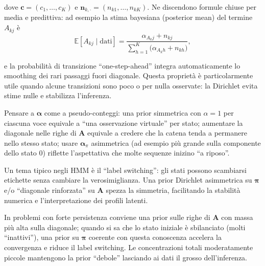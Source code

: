 \documentclass[
  italian,
  a4paper,
  a4paper,
  twoside,
  open=right,
  12pt]{scrbook}
\theoremstyle{definition}
\theoremstyle{remark}
\begin{document}
dove \(\mathbf{c}=(c_1,\dots,c_K)\) e
\(\mathbf{n}_{k,\cdot}=(n_{k1},\dots,n_{kK})\). Ne discendono formule
chiuse per media e predittiva: ad esempio la stima bayesiana (posterior
mean) del termine \(A_{k j}\) è \[
\mathbb{E}\!\left[A_{k j}\mid \text{dati}\right]
= \frac{\alpha_{A_k j} + n_{k j}}{\sum_{h=1}^K \big(\alpha_{A_k h} + n_{k h}\big)},
\]

e la probabilità di transizione ``one-step-ahead'' integra
automaticamente lo smoothing dei rari passaggi fuori diagonale. Questa
proprietà è particolarmente utile quando alcune transizioni sono poco o
per nulla osservate: la Dirichlet evita stime nulle e stabilizza
l'inferenza.

\begin{tcolorbox}[enhanced jigsaw, breakable, colframe=quarto-callout-note-color-frame, toprule=.15mm, title=\textcolor{quarto-callout-note-color}{\faInfo}\hspace{0.5em}{Intuizione sui parametri Dirichlet}, arc=.35mm, colback=white, bottomrule=.15mm, bottomtitle=1mm, colbacktitle=quarto-callout-note-color!10!white, toptitle=1mm, titlerule=0mm, opacityback=0, rightrule=.15mm, opacitybacktitle=0.6, leftrule=.75mm, left=2mm, coltitle=black]

Pensare a \(\boldsymbol{\alpha}\) come a pseudo-conteggi: una prior
simmetrica con \(\alpha=1\) per ciascuna voce equivale a ``una
osservazione virtuale'' per stato; aumentare la diagonale nelle righe di
\(\mathbf{A}\) equivale a credere che la catena tenda a permanere nello
stesso stato; usare \(\boldsymbol{\alpha}_\pi\) asimmetrica (ad esempio
più grande sulla componente dello stato 0) riflette l'aspettativa che
molte sequenze inizino ``a riposo''.

\end{tcolorbox}

Un tema tipico negli HMM è il ``label switching'': gli stati possono
scambiarsi etichette senza cambiare la verosimiglianza. Una prior
Dirichlet asimmetrica su \(\boldsymbol{\pi}\) e/o ``diagonale
rinforzata'' su \(\mathbf{A}\) spezza la simmetria, facilitando la
stabilità numerica e l'interpretazione dei profili latenti.

\begin{tcolorbox}[enhanced jigsaw, breakable, colframe=quarto-callout-tip-color-frame, toprule=.15mm, title=\textcolor{quarto-callout-tip-color}{\faLightbulb}\hspace{0.5em}{Scelte pratiche}, arc=.35mm, colback=white, bottomrule=.15mm, bottomtitle=1mm, colbacktitle=quarto-callout-tip-color!10!white, toptitle=1mm, titlerule=0mm, opacityback=0, rightrule=.15mm, opacitybacktitle=0.6, leftrule=.75mm, left=2mm, coltitle=black]

In problemi con forte persistenza conviene una prior sulle righe di
\(\mathbf{A}\) con massa più alta sulla diagonale; quando si sa che lo
stato iniziale è sbilanciato (molti ``inattivi''), una prior su
\(\boldsymbol{\pi}\) coerente con questa conoscenza accelera la
convergenza e riduce il label switching. Le concentrazioni totali
moderatamente piccole mantengono la prior ``debole'' lasciando ai dati
il grosso dell'inferenza.

\end{tcolorbox}
\end{document}
